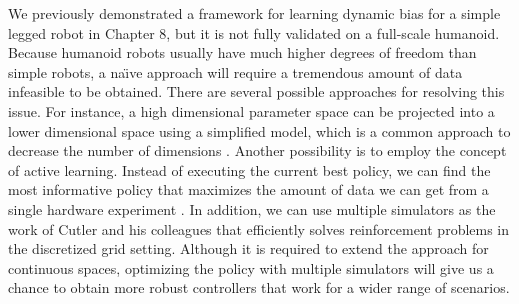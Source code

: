 We previously demonstrated a framework for learning dynamic bias
for a simple legged robot in Chapter 8, but it is not fully validated on a
full-scale humanoid.
Because humanoid robots usually have much higher degrees of freedom than simple
robots, 
a na\"{\i}ve approach will require
a tremendous amount of data infeasible to be obtained.
There are several possible approaches for resolving this issue.
For instance, a high dimensional parameter space can be projected into a lower
dimensional space using a simplified model, which is a common approach to
decrease the number of dimensions \cite{bib-humanoid13-trajectory}.
Another possibility is to employ the concept of active learning.
Instead of executing the current best policy, we can find the most
informative policy that maximizes the amount of data we can get from a
single hardware experiment \cite{DaSilva:2014:ACP}.
In addition, we can use multiple simulators as the work of Cutler and his
colleagues \cite{bib-icra14-reinforcement} that efficiently solves reinforcement
problems in the discretized grid setting. 
Although it is required to extend the approach for continuous spaces,
optimizing the policy with multiple simulators will give us a chance to obtain
more robust controllers that work for a wider range of scenarios.














